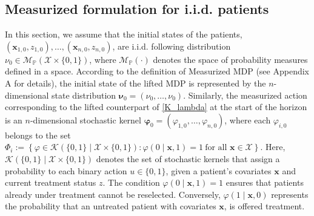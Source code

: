 \documentclass[12pt,a4paper]{article}
\newcommand{\bvarphi}{\pmb{\varphi}}
\newcommand{\bnu}{\pmb{\nu}}
\newcommand{\bx}{\mathbf{x}}
\newcommand{\bz}{\mathbf{z}}
\newcommand{\bX}{\mathbf{X}}
\newcommand{\mX}{\mathcal{X}}
\begin{document}
        

	
	


    
   

    




  \subsection{Measurized formulation for i.i.d. patients}  


In this section, we assume that the initial states of the patients, $(\bx_{1,0}, z_{1,0}), \ldots, (\bx_{n,0}, z_{n,0})$, are i.i.d. following distribution $\nu_0 \in \mathcal{M}_{\mathbb{P}}(\mX\times\{0,1\})$, where $\mathcal{M}_{\mathbb{P}}(\cdot)$ denotes the space of probability measures defined in a space. According to the definition of Measurized MDP (see Appendix A for details), the initial state of the lifted MDP is represented by the $n$-dimensional state distribution $\bnu_0 = (\nu_0, \ldots, \nu_0)$. Similarly, the measurized action corresponding to the lifted counterpart of \eqref{K_lambda} at the start of the horizon is an $n$-dimensional stochastic kernel $\bvarphi_0 = (\varphi_{1,0}, \ldots, \varphi_{n,0})$, where each $\varphi_{i,0}$ belongs to the set
$\Phi_i := \left\{ \varphi \in \mathcal{K}(\{0,1\} \mid \mathcal{X} \times \{0,1\}) : \varphi(0 \mid \bx, 1) = 1 \ \text{for all } \bx \in \mathcal{X} \right\}.
$
Here, $\mathcal{K}(\{0,1\} \mid \mathcal{X} \times \{0,1\})$ denotes the set of stochastic kernels that assign a probability to each binary action $u \in \{0,1\}$, given a patient’s covariates $\bx$ and current treatment status $z$. The condition $\varphi(0 \mid \bx, 1) = 1$ ensures that patients already under treatment cannot be reselected. Conversely, $\varphi(1 \mid \bx, 0)$ represents the probability that an untreated patient with covariates $\bx$, is offered treatment. 
\end{document}
